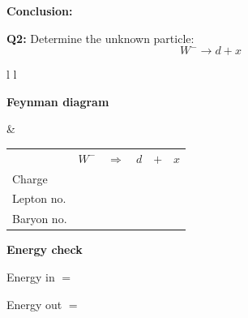 \documentclass[12pt]{article}
\begin{document}
\vspace{0.5cm}

\textbf{Conclusion:}

\vspace{2.5cm}

\newpage
\textbf{Q2:} Determine the unknown particle:
\[
W^- \rightarrow d + x
\]

\vspace{0.5cm}

\begin{tabular}{l l}

\begin{minipage}[t]{0.46\textwidth}
\vspace{0pt}
\textbf{Feynman diagram}

\vspace{0.6cm}

\begin{tikzpicture}
\begin{feynman}
  \vertex (W) at (0,2) {};
  \vertex [coordinate] (v) at (3,2) {};

  \vertex (d) at (4,4) {\(d\)};
  \vertex (x) at (5,3) {\(x\)};

  \diagram*{
    (W) -- [boson, edge label=\(W^-\), momentum'={}] (v),
    (v) -- [fermion] (d),
    (v) -- [fermion] (x),
  };
\end{feynman}
\end{tikzpicture}
\end{minipage}
&
\begin{minipage}[t]{0.50\textwidth}
\vspace{0pt}

\renewcommand{\arraystretch}{1.4}
\begin{tabular}{@{}l c c c c c@{}}
 & \(W^-\) & \(\Rightarrow\) & \(d\) & \(+\) & \(x\) \\
Charge &  &  &  &  &  \\
Lepton no. &  &  &  &  &  \\
Baryon no. &  &  &  &  &  \\
\end{tabular}

\vspace{0.6cm}

\textbf{Energy check}

Energy in $=$

Energy out $=$

\end{minipage}

\end{tabular}
\end{document}
